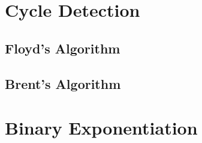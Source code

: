 \section{Cycle Detection}
\setcounter{section}{4}
\setcounter{subsection}{0}
\subsection{Floyd's Algorithm}

\subsection{Brent's Algorithm}


\section{Binary Exponentiation}
\setcounter{section}{5}

